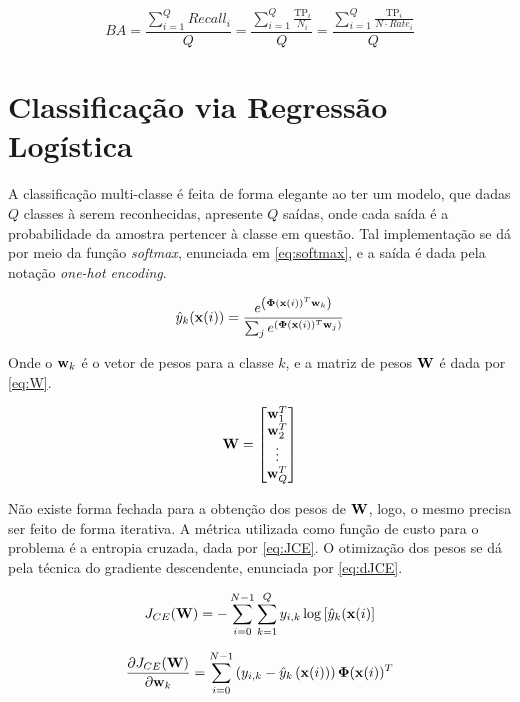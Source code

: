\begin{equation}\label{eq:ba}
	BA = \frac{\sum_{i=1}^{Q}Recall_i}{Q} = \frac{\sum_{i=1}^{Q}\frac{\text{TP}_i}{N_i}}{Q} = \frac{\sum_{i=1}^{Q}\frac{\text{TP}_i}{N\cdot Rate_i}}{Q}
\end{equation}



\clearpage
\section{Classificação via Regressão Logística}

A classificação multi-classe é feita de forma elegante ao ter um modelo, que dadas $Q$ classes à serem reconhecidas, apresente $Q$ saídas, onde cada saída é a probabilidade da amostra pertencer à classe em questão. Tal implementação se dá por meio da função \textit{softmax}, enunciada em \eqref{eq:softmax}, e a saída é dada pela notação \textit{one-hot encoding}.

\begin{equation}\label{eq:softmax}
	\hat{y}_k (\mathbf{x}(i)) = \frac{e^{\left(\mathbf{\Phi}(\mathbf{x}(i))^T\mathbf{w}_k\right)}}{\sum_{j}e^{\left(\mathbf{\Phi}(\mathbf{x}(i))^T\mathbf{w}_j\right)}}
\end{equation}

Onde o $\mathbf{w}_k$ é o vetor de pesos para a classe $k$, e a matriz de pesos $\mathbf{W}$ é dada por \eqref{eq:W}.

\begin{equation}\label{eq:W}
	\mathbf{W} = \begin{bmatrix}
		\mathbf{w}_1^T \\
		\mathbf{w}_2^T \\
		\vdots \\
		\mathbf{w}_Q^T
	\end{bmatrix}
\end{equation}

Não existe forma fechada para a obtenção dos pesos de $\mathbf{W}$, logo, o mesmo precisa ser feito de forma iterativa. A métrica utilizada como função de custo para o problema é a entropia cruzada, dada por \eqref{eq:JCE}. O otimização dos pesos se dá pela técnica do gradiente descendente, enunciada por \eqref{eq:dJCE}.

\begin{equation}\label{eq:JCE}
	J_{CE}(\mathbf{W}) = -\sum_{i=0}^{N-1}\sum_{k=1}^{Q}y_{i,k}\log\left[\hat{y}_k(\mathbf{x}(i)\right]
\end{equation}

\begin{equation}\label{eq:dJCE}
	\frac{\partial J_{CE}(\mathbf{W})}{\partial \mathbf{w}_k} = \sum_{i=0}^{N-1} \left(y_{i,k} - \hat{y}_k\left(\mathbf{x}(i)\right)\right)\mathbf{\Phi}(\mathbf{x}(i))^T
\end{equation}

